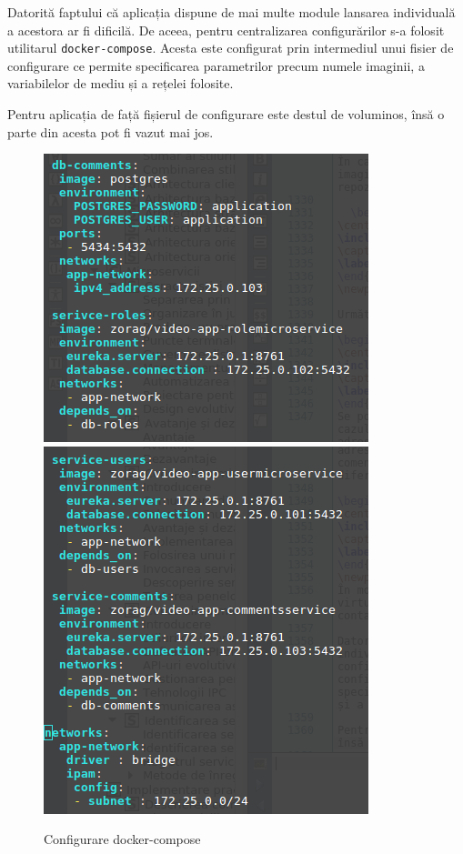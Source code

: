 \documentclass[12pt, a4paper, oneside, romanian]{teza-upb}
\begin{document}
Datorită faptului că aplicația dispune de mai multe module lansarea individuală a acestora ar fi dificilă. De aceea, pentru centralizarea configurărilor s-a folosit utilitarul \texttt{docker-compose}. Acesta este configurat prin intermediul unui fisier de configurare ce permite specificarea parametrilor precum numele imaginii, a variabilelor de mediu și a rețelei folosite. 

Pentru aplicația de față fișierul de configurare este destul de voluminos, însă o parte din acesta pot fi vazut mai jos. 


\begin{figure}[ht]
\centering
\includegraphics[scale=0.4]{img/docker-compose-config-1.png}
\includegraphics[scale=0.4]{img/docker-compose-config-2.png}
\caption{Configurare docker-compose}
\label{fig:arhi_componente}
\end{figure}
\end{document}
